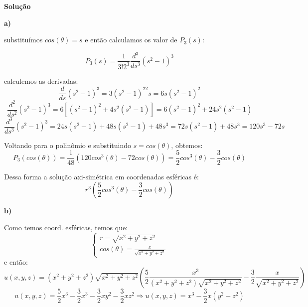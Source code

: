 \linespread{1.5}

\textbf{Solução}

\textbf{a)}

substituímos $cos(\theta) = s$ e então calculamos os valor de $P_3(s)$:

\begin{equation*}
    P_3(s) = \frac{1}{3!2^3}\frac{d^3}{ds^3}(s^2-1)^3
\end{equation*}

calculemos as derivadas:
\begin{equation*}
    \frac{d}{ds} (s^2-1)^3 = 3(s^2-1)^22s = 6s(s^2-1)^2
\end{equation*}
\begin{equation*}
    \frac{d^2}{ds^2} (s^2-1)^3 = 6[(s^2-1)^2 + 4s^2(s^2-1)] = 6(s^2-1)^2 + 24s^2(s^2-1)
\end{equation*}
\begin{equation*}
    \frac{d^3}{ds^3}(s^2-1)^3 = 24s(s^2-1) + 48s(s^2-1) + 48s^3 = 72s(s^2-1) + 48s^3 = 120s^3 - 72s
\end{equation*}

Voltando para o polinômio e substituindo $s=cos(\theta)$, obtemos:
\begin{equation*}
    P_3(cos(\theta)) = \frac{1}{48}(120cos^3(\theta) - 72cos(\theta)) = \frac{5}{2}cos^3(\theta) - \frac{3}{2}cos(\theta)
\end{equation*}

Dessa forma a solução axi-simétrica em coordenadas esféricas é:
\begin{equation*}
    \boxed{r^3\left(\frac{5}{2}cos^3(\theta) - \frac{3}{2}cos(\theta)\right)}
\end{equation*}

\textbf{b)}

Como temos coord. esféricas, temos que:
\begin{equation*}
    \begin{cases}
    r = \sqrt{x^2 + y^2 + z^2}\\
    cos(\theta) = \frac{x}{\sqrt{x^2 + y^2 + z^2}}
    \end{cases}
\end{equation*}
e então:
\begin{equation*}
    u(x,y,z) = (x^2 + y^2 + z^2)\sqrt{x^2 + y^2 + z^2}\left(\frac{5}{2}\frac{x^3}{(x^2 + y^2 + z^2)\sqrt{x^2 + y^2 + z^2}} - \frac{3}{2}\frac{x}{\sqrt{x^2 + y^2 + z^2}}\right)
\end{equation*}
\begin{equation*}
    u(x,y,z) = \frac{5}{2}x^3 - \frac{3}{2}x^3 - \frac{3}{2}xy^2 - \frac{3}{2}xz^2 \Rightarrow \boxed{u(x,y,z) = x^3 - \frac{3}{2}x(y^2 - z^2)}
\end{equation*}

